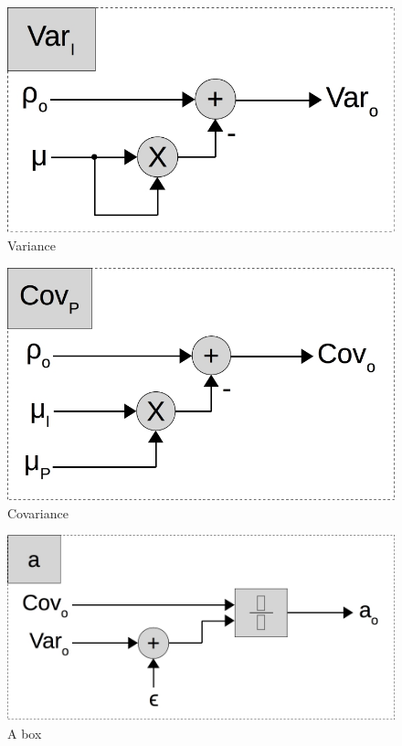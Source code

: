 \begin{figure}[ht!]
  \centering
  \includegraphics[scale=0.3]{figures/var_par}
  \caption{Variance}
  \label{fig:var_par}
\end{figure}

\begin{figure}[ht!]
  \centering
  \includegraphics[scale=0.3]{figures/cov_par}
  \caption{Covariance}
  \label{fig:cov_par}
\end{figure}

\begin{figure}[ht!]
  \centering
  \includegraphics[scale=0.3]{figures/a_par}
  \caption{A box}
  \label{fig:a_par}
\end{figure}

